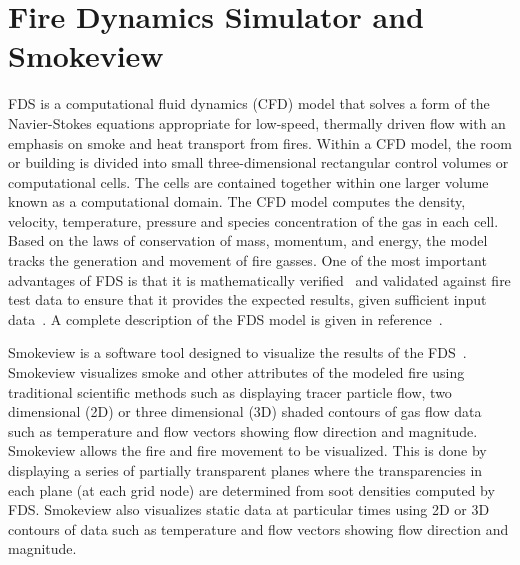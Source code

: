 \documentclass[11pt,oneside]{book}
\begin{document}
\chapter{Fire Dynamics Simulator and Smokeview}
FDS is a computational fluid dynamics (CFD) model that solves a form of the Navier-Stokes equations appropriate for low-speed, thermally driven flow with an emphasis on smoke and heat transport from fires.  Within a CFD model, the room or building is divided into small three-dimensional rectangular control volumes or computational cells.  The cells are contained together within one larger volume known as a computational domain.  The CFD model computes the density, velocity, temperature, pressure and species concentration of the gas in each cell.  Based on the laws of conservation of mass, momentum,  and energy, the model tracks the generation and movement of fire gasses. One of the most important advantages of FDS is that it is  mathematically verified~\cite{FDS_Verification_Guide} and validated against fire test data to ensure that it provides the expected results, given sufficient input data~\cite{FDS_Validation_Guide}.  A complete description of the FDS model is given in reference~\cite{FDS_Math_Guide}.

Smokeview is a software tool designed to visualize the results of the FDS~\cite{Smokeview_Users_Guide}.  Smokeview visualizes smoke and other attributes of the modeled fire using traditional scientific methods such as displaying tracer particle flow, two dimensional (2D) or three dimensional (3D) shaded contours of gas flow data such as temperature and flow vectors showing flow direction and magnitude.  Smokeview allows the fire and fire movement to be visualized.  This is done by displaying a series of partially transparent planes where the transparencies in each plane (at each grid node) are determined from soot densities computed by FDS.  Smokeview also visualizes static data at particular times using 2D or 3D contours of data such as temperature and flow vectors showing flow direction and magnitude.
\end{document}
